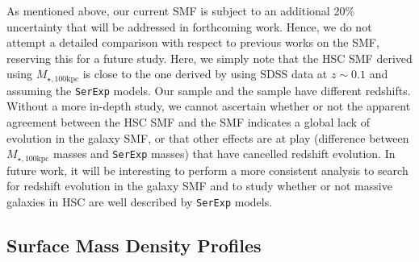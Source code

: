 \documentclass[a4paper,fleqn,usenatbib]{mnras}
\def\mstar{{$M_{\star}$}}
\def\mtot{{$M_{\star,100\mathrm{kpc}}$}}
\def\mmax{{$M_{\star,\mathrm{Max}}$}}
\def\mden{{$\mu_{\star}$}}
\begin{document}
    As mentioned above, our current SMF is subject to an additional 20\% uncertainty 
    that will be addressed in forthcoming work. 
    Hence, we do not attempt a detailed comparison with respect to previous works on 
    the SMF, reserving this for a future study. 
    Here, we simply note that the HSC SMF derived using \mtot{} is close to the one 
    derived by \citet{Bernardi2017} using SDSS data at $z{\sim}0.1$ and assuming 
    the \texttt{SerExp} models.  
    Our sample and the \citet{Bernardi2017} sample have different redshifts. 
    Without a more in-depth study, we cannot ascertain whether or not the apparent 
    agreement between the HSC SMF and the \citet{Bernardi2017} SMF indicates a global 
    lack of evolution in the galaxy SMF, or that other effects are at play 
    (difference between \mtot{} masses and \texttt{SerExp} masses) that have cancelled
    redshift evolution.  
    In future work, it will be interesting to perform a more consistent analysis to 
    search for redshift evolution in the galaxy SMF and to study whether or not 
    massive galaxies in HSC are well described by \texttt{SerExp} models.
   
            
   
    
    
    

\subsection{Surface Mass Density Profiles}
    \label{ssec:sbp_compare}
\end{document}

